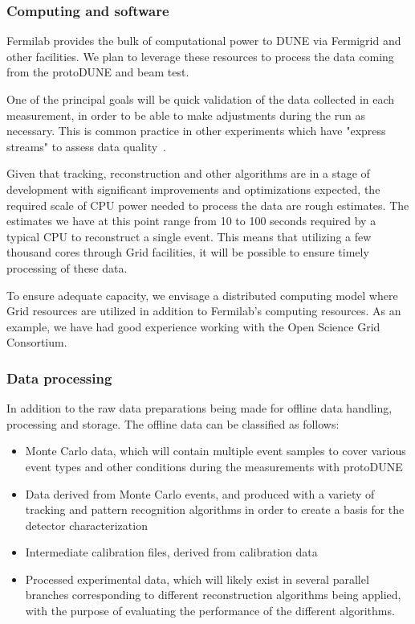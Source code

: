 \subsubsection{Computing and software}


Fermilab provides the bulk of computational power to DUNE via Fermigrid and other facilities. 
We plan to leverage these resources to process the data coming from the protoDUNE and beam test.

One of the principal goals will be quick validation of the data collected in each measurement, in
order to be able to make adjustments during the run as necessary. 
This is common practice in other experiments which have "express streams" to assess data quality~\cite{atlas_express}.


Given that tracking, reconstruction and other algorithms are in a stage of development with significant improvements
and optimizations expected, the required scale of CPU power needed to process the data are rough estimates.
The estimates we have at this point range from 10 to 100 seconds required by a typical
CPU to reconstruct a single event. 
This means that utilizing a few thousand cores through Grid facilities, it will be possible to ensure timely processing of these data.

To ensure adequate capacity, we envisage a distributed computing model where Grid resources are utilized in addition to Fermilab's computing resources.
As an example, we have had good experience working with the Open Science Grid Consortium.


\subsubsection{Data processing}
\label{dataprocess}

In addition to the raw data preparations being made for offline data handling, processing and storage.
The offline data can be classified as follows:
\begin{itemize}
\item Monte Carlo data, which will contain multiple event samples to cover various event types and other conditions during the measurements
with protoDUNE

\item Data derived from Monte Carlo events, and produced with a variety of tracking and pattern recognition algorithms in order to create a basis for the detector characterization
\item Intermediate calibration files, derived from calibration data
\item Processed experimental data, which will likely exist in several parallel branches corresponding to different reconstruction algorithms being applied, with the purpose of evaluating the performance of the different algorithms.
\end{itemize}

